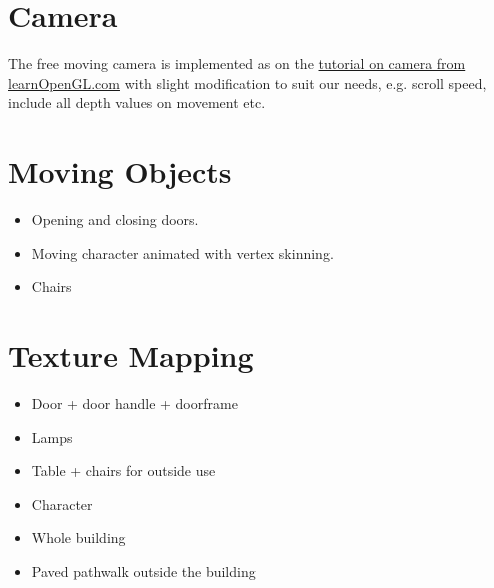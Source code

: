 \documentclass[12pt]{article}
\begin{document}
\section{Camera}
The free moving camera is implemented as on the \href{http://www.learnopengl.com/#!Getting-started/Camera}{tutorial on camera from learnOpenGL.com} with slight modification to suit our needs, e.g. scroll speed, include all depth values on movement etc.

\section{Moving Objects}
\begin{itemize}
\item Opening and closing doors.
\item Moving character animated with vertex skinning.
\item Chairs
\end{itemize}

\section{Texture Mapping}
\begin{itemize}
\item Door + door handle + doorframe
\item Lamps
\item Table + chairs for outside use
\item Character
\item Whole building
\item Paved pathwalk outside the building
\end{itemize}
\end{document}

